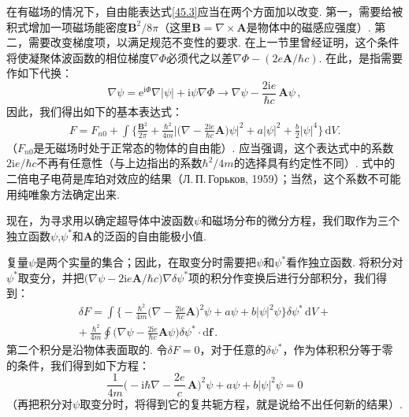 在有磁场的情况下，自由能表达式\eqref{45.3}应当在两个方面加以改变. 第一，需要给被积式增加一项磁场能密度$\bm B^2/8\pi$（这里$\bm B=\nabla\times\bm A$是物体中的磁感应强度）. 第二，需要改变梯度项，以满足规范不变性的要求. 在上一节里曾经证明，这个条件将使凝聚体波函数的相位梯度$\nabla\Phi$必须代之以差$\nabla\Phi-(2e\bm A/\hbar c)$. 在此，是指需要作如下代换：
\begin{equation*}
\nabla\psi = \mathrm e^{\mathrm i\Phi}\nabla|\psi| + \mathrm i\psi\nabla\Phi
\longrightarrow \nabla\psi - \frac{2\mathrm ie}{\hbar c}\,\bm A\psi\,,
\end{equation*}
因此，我们得出如下的基本表达式：
\begin{equation}
\begin{aligned}
F = F_{n0} + \int\Biggl\{\frac{\bm B^2}{2\pi}
+ \frac{\hbar^2}{4m}\Biggl|\Biggl(\nabla - \frac{2\mathrm ie}{\hbar c}\bm A\Biggr)\psi\Biggr|^2
+ a|\psi|^2 + \frac{b}{2}|\psi|^4\Biggr\}\,\mathrm dV.
\end{aligned}
\label{45.10}
\end{equation}
（$F_{n0}$是无磁场时处于正常态的物体的自由能）. 应当强调，这个表达式中的系数$2\mathrm ie/\hbar c$不再有任意性（与上边指出的系数$\hbar^2/4m$的选择具有约定性不同）. 式中的二倍电子电荷是库珀对效应的结果（Л.\,П.\,Горьков, 1959）；当然，这个系数不可能用纯唯象方法确定出来.

现在，为寻求用以确定超导体中波函数$\psi$和磁场分布的微分方程，我们取作为三个独立函数$\psi$,$\psi^{*}$和$\bm A$的泛函的自由能极小值.

复量$\psi$是两个实量的集合；因此，在取变分时需要把$\psi$和$\psi^{*}$看作独立函数. 将积分对$\psi^{*}$取变分，并把$\bigl(\nabla\psi-2\mathrm ie\bm A/\hbar c\bigr)\nabla\delta\psi^{*}$项的积分作变换后进行分部积分，我们得到：
\begin{equation}
\begin{aligned}
\delta F = \int\Biggl\{-\frac{\hbar^2}{4m}\Biggl(\nabla - \frac{2\mathrm ie}{\hbar c}\bm A\Biggr)^2\psi
+ a\psi + b|\psi|^2\psi\Biggr\}\delta\psi^{*}\,\mathrm dV + {}\\
+\ \frac{\hbar^2}{4m}\oint\Biggl(\nabla\psi - \frac{2\mathrm ie}{\hbar c}\bm A\psi\Biggr)\delta\psi^{*}\cdot\mathrm d\bm f\,.
\end{aligned}
\label{45.11}
\end{equation}
第二个积分是沿物体表面取的. 令$\delta F=0$，对于任意的$\delta\psi^{*}$，作为体积积分等于零的条件，我们得到如下方程：
\begin{equation}
\frac{1}{4m}\Biggl(-\mathrm i\hbar\nabla - \frac{2e}{c}\,\bm A\Biggr)^2\psi + a\psi + b|\psi|^2\psi = 0
\label{45.12}
\end{equation}
（再把积分对$\psi$取变分时，将得到它的复共轭方程，就是说给不出任何新的结果）.

